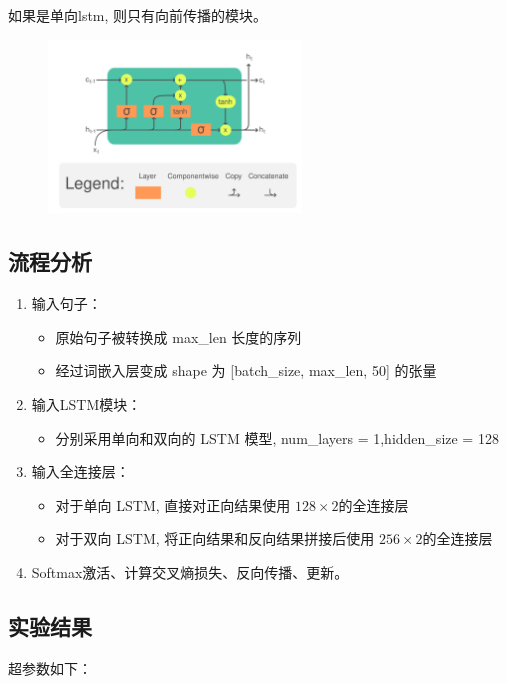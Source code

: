 \documentclass{article}
\begin{document}
如果是单向lstm, 则只有向前传播的模块。

\FloatBarrier

\begin{figure}[htbp]
    \centering
    \includegraphics[width=0.6\textwidth]{img/LSTM_Cell.svg.png}
\end{figure}

\FloatBarrier

\subsection{流程分析}

\begin{enumerate}
    \item 输入句子：
        \begin{itemize}
            \item 原始句子被转换成 max\_len 长度的序列
            \item 经过词嵌入层变成 shape 为 [batch\_size, max\_len, 50] 的张量
        \end{itemize}
    \item 输入LSTM模块：
        \begin{itemize}
            \item 分别采用单向和双向的 LSTM 模型, num\_layers = 1,hidden\_size = 128  
        \end{itemize}
    \item 输入全连接层：
        \begin{itemize}
            \item 对于单向 LSTM, 直接对正向结果使用 $128\times 2$的全连接层
            \item 对于双向 LSTM, 将正向结果和反向结果拼接后使用 $256\times 2$的全连接层
        \end{itemize}
    \item Softmax激活、计算交叉熵损失、反向传播、更新。
\end{enumerate}

\subsection{实验结果}
超参数如下：
\end{document}
